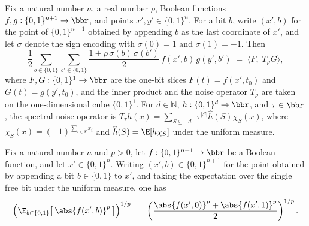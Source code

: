 \begin{lemma}
\leanok
{}
\label{BooleanAnalysis.Hypercontractivity.one_bit_slice_eq_innerProduct}
Fix a natural number $n$, a real number $\rho$, Boolean functions $f, g : \{0,1\}^{n+1}
\to \bbr$, and points
$x', y' \in \{0,1\}^n$. For a bit $b$, write $(x', b)$ for the point of $\{0,1\}^{n+1}$
obtained by appending $b$ as the last coordinate of $x'$, and let $\sigma$ denote the
sign encoding with $\sigma(0)=1$ and $\sigma(1)=-1$. Then
\[
  \frac12 \sum_{b \in \{0,1\}} \sum_{b' \in \{0,1\}}
    \frac{1 + \rho\,\sigma(b)\,\sigma(b')}{2}\,
    f(x', b)\, g(y', b')
  \;=\;
  \langle F,\; T_\rho G\rangle,
\]
where $F, G : \{0,1\}^1 \to \bbr$ are the one-bit slices $F(t) = f(x', t_0)$ and $G(t) =
g(y', t_0)$, and the inner product and the noise operator $T_\rho$ are taken on the
one-dimensional cube $\{0,1\}^1$. For $d\in\mathbb N$, $h:\{0,1\}^d\to\bbr$, and
$\tau\in\bbr$, the spectral noise operator is $T_\tau
h(x)=\sum_{S\subseteq[d]}\tau^{|S|}\widehat h(S)\chi_S(x)$, where
$\chi_S(x)=(-1)^{\sum_{i\in S}x_i}$ and $\widehat h(S)=\E[h\chi_S]$ under the uniform
measure.
\end{lemma}

\begin{lemma}
\leanok
{}
\label{BooleanAnalysis.Hypercontractivity.one_bit_norm_slice}
Fix a natural number $n$ and $p > 0$, let $f : \{0,1\}^{n+1} \to \bbr$ be a Boolean
function, and let $x' \in
\{0,1\}^n$. Writing $(x', b) \in \{0,1\}^{n+1}$ for the point obtained by appending a
bit $b \in \{0,1\}$ to $x'$, and taking the expectation over the single free bit under
the uniform measure, one has
\[
  \Bigl(\E_{b \in \{0,1\}}\bigl[\,\abs{f(x', b)}^p\,\bigr]\Bigr)^{1/p}
  \;=\;
  \left(\frac{\abs{f(x', 0)}^p + \abs{f(x', 1)}^p}{2}\right)^{1/p}.
\]
\end{lemma}

